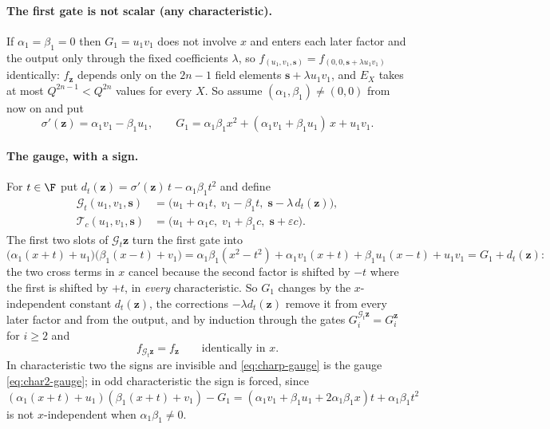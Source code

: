 \paragraph{The first gate is not scalar (any characteristic).}
If $\alpha_1=\beta_1=0$ then $G_1=u_1v_1$ does not involve $x$ and enters each later
factor and the output only through the fixed coefficients $\lambda$, so
$f_{(u_1,v_1,\mathbf s)}=f_{(0,0,\mathbf s+\lambda u_1v_1)}$ identically: $f_{\mathbf z}$
depends only on the $2n-1$ field elements $\mathbf s+\lambda u_1v_1$, and $E_X$ takes at
most $Q^{2n-1}<Q^{2n}$ values for every $X$.  So assume $(\alpha_1,\beta_1)\neq(0,0)$ from
now on and put
\begin{equation}
   \sigma'(\mathbf z)=\alpha_1v_1-\beta_1u_1,
   \qquad
   G_1=\alpha_1\beta_1x^2+(\alpha_1v_1+\beta_1u_1)\,x+u_1v_1 .
   \label{eq:charp-firstgate}
\end{equation}

\paragraph{The gauge, with a sign.}
For $t\in\F$ put $d_t(\mathbf z)=\sigma'(\mathbf z)\,t-\alpha_1\beta_1t^2$ and define
\begin{equation}
   \begin{aligned}
   \mathcal G_t(u_1,v_1,\mathbf s)&=\bigl(u_1+\alpha_1t,\;v_1-\beta_1t,\;\mathbf s-\lambda\,d_t(\mathbf z)\bigr),\\
   \mathcal T_c(u_1,v_1,\mathbf s)&=\bigl(u_1+\alpha_1c,\;v_1+\beta_1c,\;\mathbf s+\varepsilon c\bigr).
   \end{aligned}
   \label{eq:charp-gauge}
\end{equation}
The first two slots of $\mathcal G_t\mathbf z$ turn the first gate into
\[
   \bigl(\alpha_1(x+t)+u_1\bigr)\bigl(\beta_1(x-t)+v_1\bigr)
   =\alpha_1\beta_1(x^2-t^2)+\alpha_1v_1(x+t)+\beta_1u_1(x-t)+u_1v_1
   =G_1+d_t(\mathbf z):
\]
the two cross terms in $x$ cancel because the second factor is shifted by $-t$ where the
first is shifted by $+t$, in \emph{every} characteristic.  So $G_1$ changes by the
$x$-independent constant $d_t(\mathbf z)$, the corrections $-\lambda d_t(\mathbf z)$ remove
it from every later factor and from the output, and by induction through the gates
$G_i^{\mathcal G_t\mathbf z}=G_i^{\mathbf z}$ for $i\ge2$ and
\begin{equation}
   f_{\mathcal G_t\mathbf z}=f_{\mathbf z}\qquad\text{identically in }x .
   \label{eq:charp-gauge-invariance}
\end{equation}
In characteristic two the signs are invisible and \eqref{eq:charp-gauge} is the gauge
\eqref{eq:char2-gauge}; in odd characteristic the sign is forced, since
$(\alpha_1(x+t)+u_1)(\beta_1(x+t)+v_1)-G_1=(\alpha_1v_1+\beta_1u_1+2\alpha_1\beta_1x)t+\alpha_1\beta_1t^2$
is not $x$-independent when $\alpha_1\beta_1\neq0$.

